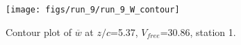 \begin{figure}[H]
\centering
\texttt{[image: figs/run\_9/run\_9\_W\_contour]}
\caption{Contour plot of $\overline{w}$ at $z/c$=5.37, $V_{free}$=30.86, station 1.}
\label{fig:run_9_W_contour}
\end{figure}


